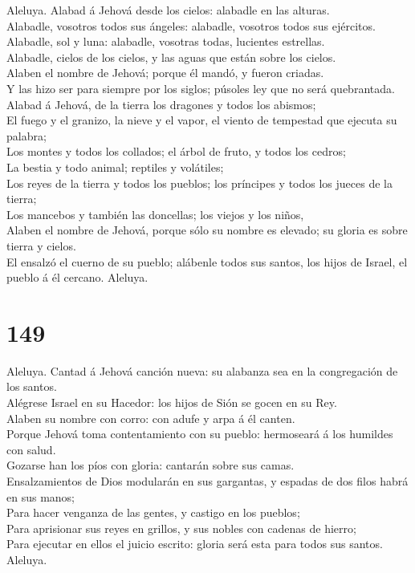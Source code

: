  Aleluya. Alabad á Jehová desde los cielos: alabadle en las
alturas.\\
 Alabadle, vosotros todos sus ángeles: alabadle, vosotros
todos sus ejércitos.\\
 Alabadle, sol y luna: alabadle, vosotras todas, lucientes
estrellas.\\
 Alabadle, cielos de los cielos, y las aguas que están sobre
los cielos.\\
 Alaben el nombre de Jehová; porque él mandó, y fueron
criadas.\\
 Y las hizo ser para siempre por los siglos; púsoles ley que
no será quebrantada.\\
 Alabad á Jehová, de la tierra los dragones y todos los
abismos;\\
 El fuego y el granizo, la nieve y el vapor, el viento de
tempestad que ejecuta su palabra;\\
 Los montes y todos los collados; el árbol de fruto, y todos
los cedros;\\
 La bestia y todo animal; reptiles y volátiles;\\
 Los reyes de la tierra y todos los pueblos; los príncipes
y todos los jueces de la tierra;\\
 Los mancebos y también las doncellas; los viejos y los
niños,\\
 Alaben el nombre de Jehová, porque sólo su nombre es
elevado; su gloria es sobre tierra y cielos.\\
 El ensalzó el cuerno de su pueblo; alábenle todos sus
santos, los hijos de Israel, el pueblo á él cercano. Aleluya.

\hypertarget{section-148}{%
\section{149}\label{section-148}}

 Aleluya. Cantad á Jehová canción nueva: su alabanza sea en
la congregación de los santos.\\
 Alégrese Israel en su Hacedor: los hijos de Sión se gocen
en su Rey.\\
 Alaben su nombre con corro: con adufe y arpa á él canten.\\
 Porque Jehová toma contentamiento con su pueblo: hermoseará
á los humildes con salud.\\
 Gozarse han los píos con gloria: cantarán sobre sus
camas.\\
 Ensalzamientos de Dios modularán en sus gargantas, y
espadas de dos filos habrá en sus manos;\\
 Para hacer venganza de las gentes, y castigo en los
pueblos;\\
 Para aprisionar sus reyes en grillos, y sus nobles con
cadenas de hierro;\\
 Para ejecutar en ellos el juicio escrito: gloria será esta
para todos sus santos. Aleluya.

